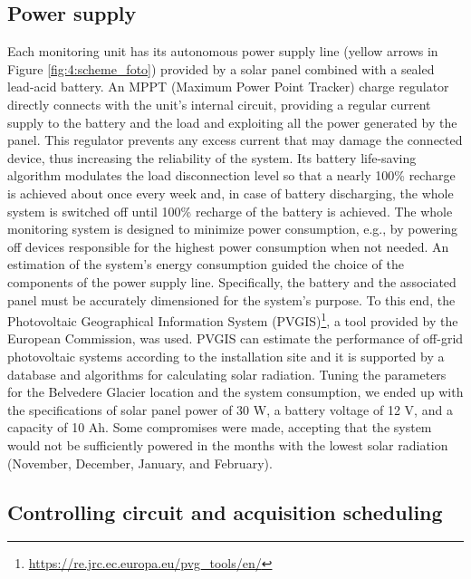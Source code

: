 \subsection{Power supply}\label{Power_supply}
Each monitoring unit has its autonomous power supply line (yellow arrows in Figure
\ref{fig:4:scheme_foto}) provided by a solar panel combined with a sealed lead-acid
battery. An MPPT (Maximum Power Point Tracker) charge regulator directly connects with
the unit's internal circuit, providing a regular current supply to the battery
and the load and exploiting all the power generated by the panel. This regulator prevents
any excess current that may damage the connected device, thus increasing the reliability of the system. 
Its battery life-saving algorithm modulates the load disconnection level
so that a nearly 100\% recharge is achieved about once every week and, in case of battery discharging, the whole system is switched off until 100\% recharge of the battery is achieved.
The whole monitoring system is designed to minimize power consumption, e.g., by powering off devices responsible for the highest power consumption when not needed.
An estimation of the system's energy consumption guided the choice of the components of the power supply line. 
Specifically, the battery and the associated panel must be accurately dimensioned for the system's purpose. 
To this end, the Photovoltaic Geographical Information System (PVGIS)\footnote{\url{https://re.jrc.ec.europa.eu/pvg_tools/en/}}, a tool provided by the European Commission, was used.
PVGIS can estimate the performance of off-grid photovoltaic systems according to the installation site and it is supported by a database and algorithms for calculating solar radiation. 
Tuning the parameters for the Belvedere Glacier location and the system consumption, we ended up with the specifications of solar panel power of 30 W, a battery voltage of 12 V, and a capacity of 10 Ah. 
Some compromises were made, accepting that the system would not be sufficiently powered in the months with the lowest solar radiation (November, December, January, and February). 

\subsection{Controlling circuit and acquisition scheduling}\label{Control}

